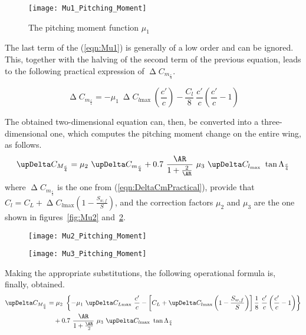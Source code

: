 %
\begin{figure}[!t]
\centering
\texttt{[image: Mu1\_Pitching\_Moment]}
\caption{The pitching moment function $\mu_1$}
\label{fig:Mu1}
\end{figure}
%
The last term of the (\ref{eqn:Mu1}) is generally of a low order and can be ignored. This, together with the halving of the second term of the previous equation, leads to the following practical expression of $\upDelta C_{m_{\frac{c}{4}}}$.

\begin{equation}
\upDelta C_{m_{\frac{c}{4}}}=-\mu_1\ \upDelta C_{l\text{max}}\ \left(\dfrac{c'}{c}\right)-\dfrac{C_l}{8}\ \dfrac{c'}{c}\left(\dfrac{c'}{c}-1\right)
\label{eqn:DeltaCmPractical}
\end{equation}

\bigskip
\noindent
The obtained two-dimensional equation can, then, be converted into a three-dimensional one, which computes the pitching moment change on the entire wing, as follows.
%
\begin{equation}
\upDelta C_{M_{\frac{c}{4}}}=\mu_2\ \upDelta C_{m_{\frac{c}{4}}}+0.7\ \dfrac{\AR}{1+\frac{2}{\AR}}\ \mu_3\ \upDelta C_{l_{\text{max}}}\ \tan\Lambda_{\frac{c}{4}}
\label{eqn:DeltaCM}
\end{equation}
%
where $\upDelta C_{m_{\frac{c}{4}}}$ is the one from (\ref{eqn:DeltaCmPractical}), provide that $C_l=C_L+\upDelta C_{l\text{max}}\left(1-\frac{S_{w,f}}{S}\right)$, and the correction factors $\mu_2$ and $\mu_3$ are the one shown in figures~\ref{fig:Mu2} and~\ref{fig:Mu3}.

\bigskip
\begin{figure}[H]
\centering
\begin{minipage}{.5\textwidth}
\centering
\texttt{[image: Mu2\_Pitching\_Moment]}
\label{fig:Mu2}
\end{minipage}%
\begin{minipage}{.5\textwidth}
\centering
\texttt{[image: Mu3\_Pitching\_Moment]}
\label{fig:Mu3}
\end{minipage}
\end{figure}

\noindent
Making the appropriate substitutions, the following operational formula is, finally, obtained.
%
\begin{equation}
\begin{split}
\upDelta C_{M_{\frac{c}{4}}}&=\mu_2\ \left\{-\mu_1\ \upDelta C_{L\text{max}}\ \dfrac{c'}{c}-\left[C_L+\upDelta C_{l\text{max}}\left(1-\dfrac{S_{w,f}}{S}\right)\right]\dfrac{1}{8}\ \dfrac{c'}{c}\left(\dfrac{c'}{c}-1\right)\right\}\\
&\quad+0.7\ \dfrac{\AR}{1+\frac{\AR}{2}}\ \mu_3\ \upDelta C_{l\text{max}}\ \tan\Lambda_{\frac{c}{4}}
\label{eqn:DeltaCMPractical}
\end{split}
\end{equation}
%
